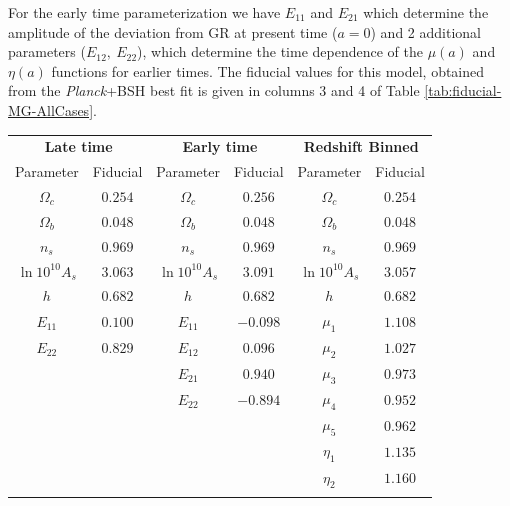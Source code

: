 For the early time parameterization we have $E_{11}$ and $E_{21}$
which determine the amplitude of the deviation from GR at present
time ($a=0$) and 2 additional parameters ($E_{12},\ E_{22}$), which
determine the time dependence of the $\mu(a)$ and $\eta(a)$ functions
for earlier times. The
fiducial values for this model, obtained from the {\it Planck}+BSH best
fit is given in columns 3 and 4 of Table \ref{tab:fiducial-MG-AllCases}.

\begin{table}[htbp]
\centering{}
\begin{tabular}{|cc|cc|cc|}
\hline 
\multicolumn{2}{|c|}{\textbf{Late time}} &
\multicolumn{2}{c|}{\textbf{Early time}} &
\multicolumn{2}{c|}{\Tstrut \textbf{Redshift Binned}}\tabularnewline
\multicolumn{1}{|c}{Parameter } & \multicolumn{1}{c|}{Fiducial } &
\multicolumn{1}{c}{Parameter } & \multicolumn{1}{c|}{Fiducial } &
\multicolumn{1}{c}{Parameter } & \multicolumn{1}{c|}{Fiducial }\tabularnewline
\hline 
$\Omega_{c}$  & \multicolumn{1}{c|}{$0.254$ } & $\Omega_{c}$  &
\multicolumn{1}{c|}{$0.256$} & $\Omega_{c}$  & $0.254$ \tabularnewline
$\Omega_{b}$  & \multicolumn{1}{c|}{$0.048$ } & $\Omega_{b}$  &
\multicolumn{1}{c|}{$0.048$} & $\Omega_{b}$  & $0.048$ \tabularnewline
$n_{s}$  & \multicolumn{1}{c|}{$0.969$ } & $n_{s}$  &
\multicolumn{1}{c|}{$0.969$} & $n_{s}$  & $0.969$ \tabularnewline
$\ln10^{10}A_{s}$  & \multicolumn{1}{c|}{$3.063$ } & $\ln10^{10}A_{s}$  &
\multicolumn{1}{c|}{$3.091$} & $\ln10^{10}A_{s}$  & $3.057$ \tabularnewline
$h$  & \multicolumn{1}{c|}{$0.682$ } & $h$  & \multicolumn{1}{c|}{$0.682$} &
$h$  & $0.682$ \tabularnewline
$E_{11}$  & \multicolumn{1}{c|}{$0.100$ } & $E_{11}$  &
\multicolumn{1}{c|}{$-0.098$} & $\mu_{1}$  & $1.108$\tabularnewline
$E_{22}$  & \multicolumn{1}{c|}{$0.829$ } & $E_{12}$  &
\multicolumn{1}{c|}{$0.096$} & $\mu_{2}$  & $1.027$\tabularnewline
\cline{1-2} 
\multicolumn{1}{c}{} & \multicolumn{1}{c|}{} & $E_{21}$  &
\multicolumn{1}{c|}{$0.940$} & $\mu_{3}$  & $0.973$\tabularnewline
\multicolumn{1}{c}{} & \multicolumn{1}{c|}{} & $E_{22}$  &
\multicolumn{1}{c|}{$-0.894$} & $\mu_{4}$  & $0.952$\tabularnewline
\cline{3-4} 
\multicolumn{1}{c}{} & \multicolumn{1}{c}{} & \multicolumn{1}{c}{} &
\multicolumn{1}{c|}{} & $\mu_{5}$  & $0.962$\tabularnewline
\multicolumn{1}{c}{} & \multicolumn{1}{c}{} & \multicolumn{1}{c}{} &
\multicolumn{1}{c|}{} & $\eta_{1}$  & $1.135$\tabularnewline
\multicolumn{1}{c}{} & \multicolumn{1}{c}{} & \multicolumn{1}{c}{} &
\multicolumn{1}{c|}{} & $\eta_{2}$  & $1.160$\tabularnewline
\multicolumn{1}{c}{} & \multicolumn{1}{c}{} & \multicolumn{1}{c}{} &

\end{tabular}
\end{table}
